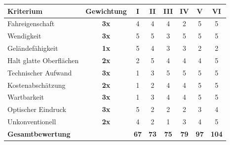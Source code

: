 \begin{tabular}{|l|c|c|c|c|c|c|c|}
	\hline
	\textbf{Kriterium} 
	& \textbf{Gewichtung} 
	& \textbf{\textbf{I}} 
	& \textbf{\textbf{II}} 
	& \textbf{\textbf{III}} 
	& \textbf{\textbf{IV}} 
	& \textbf{\textbf{V}} 
	& \textbf{\textbf{VI}} \\
	\hline
	Fahreigenschaft                &  \textbf{3x}  & 4 & 4 & 4 & 2 & 5 & 5 \\
	\hline
	Wendigkeit                &  \textbf{3x} & 5 & 5 & 3 & 5 & 5 & 5 \\
	\hline
	Geländefähigkeit                  &  \textbf{1x} & 5 & 4 & 3 & 3 & 2 & 2 \\
	\hline
	Halt glatte  Oberflächen                  & \textbf{2x} & 2 & 5 &4  & 4 & 4 & 5 \\
	\hline
	Technischer Aufwand       &  \textbf{3x} & 1 & 3 & 5 &5 &5  & 5 \\
	\hline
	Kostenabschätzung         & \textbf{2x}& 1 & 2 & 4 & 4 & 5 & 5 \\
	\hline
	Wartbarkeit               &  \textbf{3x} & 1 & 3 & 4 & 4 & 5 & 5 \\
	\hline
	Optischer Eindruck                  & \textbf{3x}  & 5 & 2 & 2 & 2  & 3 & 4 \\
	\hline
	Unkonventionell                  &  \textbf{2x} & 4 & 2 & 1 & 3 & 4 & 5 \\
	\hline
	\hline
	\textbf{Gesamtbewertung}  &  & \textbf{67} & \textbf{73} & \textbf{75} & \textbf{79} & \textbf{97} & \textbf{104} \\
	
	
	\hline
\end{tabular}